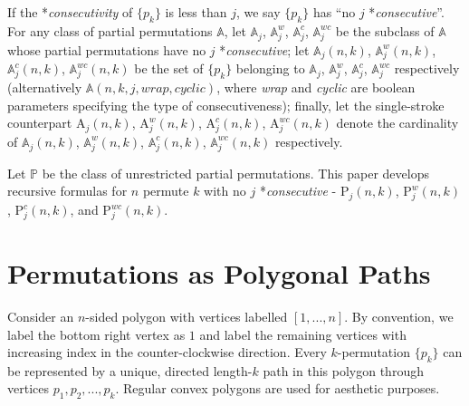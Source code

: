 \documentclass[a4paper, 12pt] {article}
\theoremstyle{remark}
\theoremstyle{plain}
\theoremstyle{remark}
\begin{document}
If the *\textit{consecutivity} of $\{p_k\}$ is less than $j$, we say $\{p_k\}$ has ``no $j$ *\textit{consecutive}''.
For any class of partial permutations $\mathbb{A}$, let $\mathbb{A}_{j}^{}$, $\mathbb{A}_{j}^{w}$, $\mathbb{A}_{j}^{c}$, $\mathbb{A}_{j}^{wc}$ be the subclass of $\mathbb{A}$ whose partial permutations have no $j$ *\textit{consecutive}; let $\mathbb{A}_{j}^{}(n, k)$, $\mathbb{A}_{j}^{w}(n, k)$, $\mathbb{A}_{j}^{c}(n, k)$, $\mathbb{A}_{j}^{wc}(n, k)$ be the set of $\{p_k\}$ belonging to $\mathbb{A}_{j}^{}$, $\mathbb{A}_{j}^{w}$, $\mathbb{A}_{j}^{c}$, $\mathbb{A}_{j}^{wc}$ respectively (alternatively $\mathbb{A}(n, k, j, wrap, cyclic)$, where \textit{wrap} and \textit{cyclic} are boolean parameters specifying the type of consecutiveness); finally, let the single-stroke counterpart $\textrm{A}_{j}^{}(n, k)$, $\textrm{A}_{j}^{w}(n, k)$, $\textrm{A}_{j}^{c}(n, k)$, $\textrm{A}_{j}^{wc}(n, k)$ denote the cardinality of $\mathbb{A}_{j}^{}(n, k)$, $\mathbb{A}_{j}^{w}(n, k)$, $\mathbb{A}_{j}^{c}(n, k)$, $\mathbb{A}_{j}^{wc}(n, k)$ respectively.

Let $\mathbb{P}$ be the class of unrestricted partial permutations.
This paper develops recursive formulas for $n$ permute $k$ with no $j$ *\textit{consecutive} - $\textrm{P}_{j}^{}(n, k)$, $\textrm{P}_{j}^{w}(n, k)$, $\textrm{P}_{j}^{c}(n, k)$, and $\textrm{P}_{j}^{wc}(n, k)$.



\section{Permutations as Polygonal Paths}
\label{PPP}

Consider an $n$-sided polygon with vertices labelled $[1, ..., n]$. By convention, we label the bottom right vertex as $1$ and label the remaining vertices with increasing index in the counter-clockwise direction.
Every $k$-permutation $\{p_k\}$ can be represented by a unique, directed length-$k$ path in this polygon through vertices $p_1, p_2, ..., p_k$. Regular convex polygons are used for aesthetic purposes.
\end{document}
